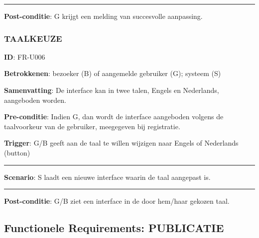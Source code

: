 \vspace{2 mm}
\hrule
\vspace{4 mm}

\noindent \textbf{Post-conditie}: G krijgt een melding van succesvolle aanpassing. \\




\subsubsection{TAALKEUZE}
\vspace{2 mm}

\textbf{ID}: FR-U006
\vspace{2 mm}

\noindent \textbf{Betrokkenen}: bezoeker (B) of aangemelde gebruiker (G); systeem (S) 
\vspace{2 mm}

\noindent \textbf{Samenvatting}: De interface kan in twee talen, Engels en Nederlands, aangeboden worden. 
\vspace{2 mm}

\noindent \textbf{Pre-conditie}: Indien G, dan wordt de interface aangeboden volgens de taalvoorkeur van de gebruiker, meegegeven bij registratie.
\vspace{2 mm}

\noindent \textbf{Trigger}: G/B geeft aan de taal te willen wijzigen naar Engels of Nederlands (button)

\vspace{4 mm}
\hrule
\vspace{2 mm}
\noindent \textbf{Scenario}:
\noindent S laadt een nieuwe interface waarin de taal aangepast is.
\vspace{2 mm}
\hrule
\vspace{4 mm}

\noindent \textbf{Post-conditie}: G/B ziet een interface in de door hem/haar gekozen taal. \\






\clearpage




\subsection{Functionele Requirements: PUBLICATIE}
\vspace{4 mm}

